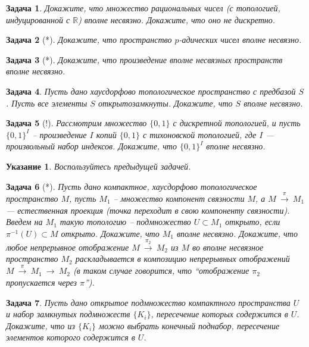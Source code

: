 \documentclass[12pt]{book}
\newcommand{\arrow}{{\:\longrightarrow\:}}
\def\R{{\mathbb R}}
\theoremstyle{upshape}
\newtheorem{zadacha}{Задача}[chapter]
\theoremstyle{generic}
\theoremstyle{upshapenonumber}
\newtheorem{ukazanie}{Указание}[section]
\newcommand{\следствие}{%
     \refstepcounter{teorema}
     {\noindent\bf Следствие \thechapter.\arabic{teorema}:\ }}
\newcommand{\пример}{%
     \refstepcounter{teorema}
     {\noindent\bf Пример \thechapter.\arabic{teorema}:\ }}
\newcommand{\лемма}{%
     \refstepcounter{teorema}
     {\noindent\bf Лемма \thechapter.\arabic{teorema}:\ }}
\newcommand{\теорема}{%
     \refstepcounter{teorema}
     {\noindent\bf Теорема \thechapter.\arabic{teorema}:\ }}
\newcommand{\утверждение}{%
     \refstepcounter{teorema}
     {\noindent\bf Утверждение \thechapter.\arabic{teorema}:\ }}
\begin{document}
{\begin{zadacha}
Докажите, что множество рациональных чисел
(с топологией, индуцированной с $\R$) вполне несвязно.
Докажите, что оно не дискретно.
\end{zadacha}

\begin{zadacha}[*]
Докажите, что пространство $p$-адических чисел
вполне несвязно.
\end{zadacha}

\begin{zadacha}[*]
Докажите, что произведение вполне несвязных
пространств вполне несвязно.
\end{zadacha}

\begin{zadacha} 
Пусть дано хаусдорфово топологическое пространство с предбазой $S$.
Пусть все элементы $S$ открытозамкнуты. Докажите, что
$S$ вполне несвязно.
\end{zadacha}

\begin{zadacha}[!]
Рассмотрим множество $\{0, 1\}$
с дискретной топологией, и пусть $\{0, 1\}^I$ --
произведение $I$ копий $\{0, 1\}$ с тихоновской
топологией, где $I$ --- произвольный набор индексов.
Докажите, что $\{0, 1\}^I$ вполне несвязно.
\end{zadacha}

\begin{ukazanie}
Воспользуйтесь предыдущей задачей.
\end{ukazanie}

\begin{zadacha}[*]
Пусть дано компактное, хаусдорфово
топологическое пространство $M$,  пусть $M_1$ --
множество компонент связности $M$, а
$M\overset{\pi}{\arrow} M_1$ --- естественная проекция (точка
переходит в свою компоненту связности).
Введем на $M_1$ такую топологию --
подмножество $U\subset M_1$ открыто, если $\pi^{-1}(U) \subset M$
открыто.
Докажите, что $M_1$ вполне несвязно.
Докажите, что любое непрерывное отображение
$M\overset{\pi_2}{\arrow} M_2$
из $M$ во вполне несвязное пространство $M_2$
раскладывается в композицию непрерывных отображений
$M\overset{\pi}{\arrow} M_1 \arrow  M_2$
(в таком случае говорится, что
``отображение $\pi_2$ пропускается через $\pi$'').
\end{zadacha}

\begin{zadacha} 
Пусть дано открытое подмножество компактного 
пространства $U$ и набор замкнутых
подмножеств $\{K_i\}$, пересечение которых содержится в $U$.
Докажите, что из $\{K_i\}$ можно выбрать конечный
поднабор, пересечение элементов которого содержится в $U$.
\end{zadacha}

}
\end{document}

